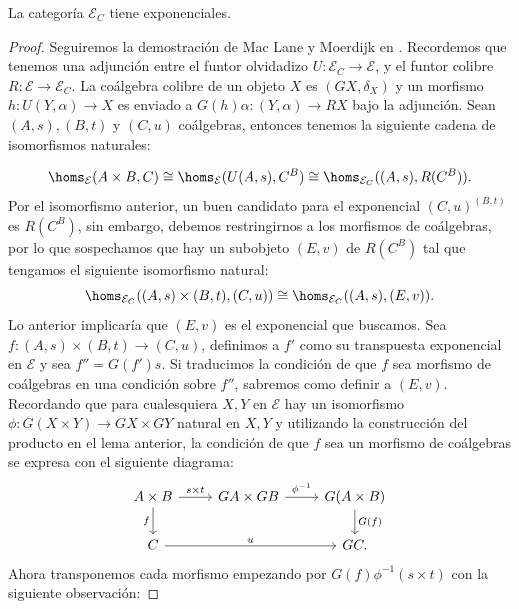 \begin{lemma}
  La categoría $\mathcal{E}_C$ tiene exponenciales.
\end{lemma}
\begin{proof}
  Seguiremos la demostración de Mac Lane y Moerdijk en
  \cite{maclane2012sheaves}.  Recordemos que tenemos una adjunción entre el funtor olvidadizo $U\colon \mathcal{E}_C\to \mathcal{E}$, y el
  funtor colibre $R\colon \mathcal{E}\to \mathcal{E}_C$.
  La coálgebra colibre de un objeto $X$ es $(GX, \delta_X)$ y un morfismo $h\colon U(Y,\alpha)\to X$ es enviado a
  $G(h)\alpha\colon (Y,\alpha)\to RX$ bajo la adjunción. Sean $(A,s), (B,t)$ y $(C,u)$ coálgebras, entonces tenemos la siguiente cadena de isomorfismos naturales:
  
  \begin{equation*}
    \homs_{\mathcal{E}}(A\times B, C) \cong \homs_{\mathcal{E}}(U(A,s), C^B) \cong \homs_{\mathcal{E}_C}((A,s), R(C^B)).
  \end{equation*}
  Por el isomorfismo anterior, un buen candidato
  para el exponencial $(C,u)^{(B,t)}$ es $R(C^B)$, sin embargo, debemos restringirnos a los morfismos
  de coálgebras, por lo que sospechamos que hay un subobjeto $(E,v)$ de $R(C^B)$ tal que tengamos
  el siguiente isomorfismo natural:
  \begin{equation*}
    \homs_{\mathcal{E}_C}((A,s)\times (B,t), (C,u)) \cong \homs_{\mathcal{E}_C}((A,s), (E,v)).
  \end{equation*}
  Lo anterior implicaría que $(E,v)$ es el exponencial que buscamos. Sea $f\colon (A,s)\times (B,t) \to (C,u)$,
  definimos a $f'$ como su transpuesta exponencial en $\mathcal{E}$ y sea $f''=G(f')s$. Si traducimos
  la condición de que $f$ sea morfismo de coálgebras en una condición sobre $f''$, sabremos como
  definir a $(E,v)$. Recordando que para cualesquiera $X,Y$ en $\mathcal{E}$ hay un isomorfismo 
  $\phi\colon G(X\times Y)\to GX\times GY$ natural en $X,Y$ y utilizando la construcción del producto en el lema anterior, la condición de que $f$ sea un morfismo de 
  coálgebras se expresa con el siguiente diagrama:
  \begin{equation*}
    \begin{tikzcd}
      A\times B\ar{r}{s\times t}\ar[swap]{d}{f} & GA\times GB\ar{r}{\phi^{-1}} & G(A\times B)\ar{d}{G(f)} \\
      C\ar{rr}{u} & {} & GC.
    \end{tikzcd}
  \end{equation*}
  Ahora transponemos cada morfismo empezando por $G(f)\phi^{-1}(s\times t)$ con la siguiente observación:

\end{proof}
